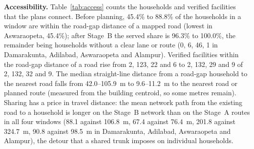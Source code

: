 \documentclass[preprint,12pt]{elsarticle}
\begin{document}
\textbf{Accessibility.} Table~\ref{tab:access} counts the households and verified facilities that the plans connect. Before planning, 45.4\% to 88.8\% of the households in a window are within the road-gap distance of a mapped road (lowest in Aswaraopeta, 45.4\%); after Stage~B the served share is 96.3\% to 100.0\%, the remainder being households without a clear lane or route (0, 6, 46, 1 in Damarakunta, Adilabad, Aswaraopeta and Alampur). Verified facilities within the road-gap distance of a road rise from 2, 123, 22 and 6 to 2, 132, 29 and 9 of 2, 132, 32 and 9. The median straight-line distance from a road-gap household to the nearest road falls from 42.0--105.9~m to 9.6--11.2~m to the nearest road or planned route (measured from the building centroid, so some metres remain). Sharing has a price in travel distance: the mean network path from the existing road to a household is longer on the Stage~B network than on the Stage~A routes in all four windows (88.1 against 106.8~m, 67.4 against 76.4~m, 201.8 against 324.7~m, 90.8 against 98.5~m in Damarakunta, Adilabad, Aswaraopeta and Alampur), the detour that a shared trunk imposes on individual households.
\end{document}
